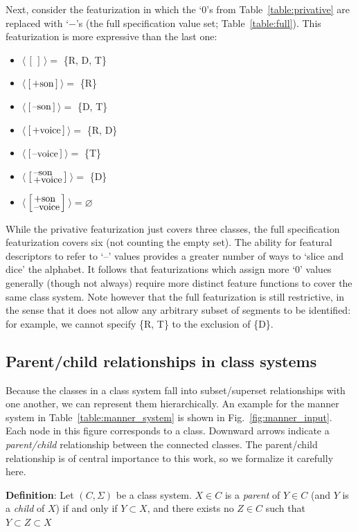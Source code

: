 \documentclass[12pt, oneside]{article}   	%
\newcommand{\featmat}[1]
{$\begin{bsmallmatrix*}[l]\text{\normalsize #1}\end{bsmallmatrix*}$}
\newcommand{\featmattwo}[2]{$\begin{bsmallmatrix*}[l]\text{\normalsize #1}\\\text{\normalsize #2}\end{bsmallmatrix*}$}
\begin{document}
Next, consider the featurization in which the `$0$'s from Table~\ref{table:privative} are replaced with `$-$'s (the full specification value set; Table~\ref{table:full}). This featurization is more expressive than the last one: 
\begin{itemize}
    \item $\langle \, [\,] \, \rangle =$ \{R, D, T\}
    \item $\langle \, $\featmat{+son}$ \, \rangle =$ \{R\}
    \item $\langle \, $\featmat{--son}$ \, \rangle =$ \{D, T\}
    \item $\langle \, $\featmat{+voice}$\, \rangle =$ \{R, D\}
    \item $\langle \, $\featmat{--voice}$  \, \rangle=$ \{T\}
    \item $\langle \, $\featmattwo{--son}{+voice}$ \, \rangle =$ \{D\}
    \item $\langle \, $\featmattwo{+son}{--voice}$ \, \rangle = \varnothing$
    \end{itemize}
While the privative featurization just covers three classes, the full specification featurization covers six (not counting the empty set). The ability for featural descriptors to refer to `--' values provides a greater number of ways to `slice and dice' the alphabet. It follows that featurizations which assign more `$0$' values generally (though not always) require more distinct feature functions to cover the same class system. Note however that the full featurization is still restrictive, in the sense that it does not allow any arbitrary subset of segments to be identified: for example, we cannot specify \{R, T\} to the exclusion of \{D\}.

\subsection{Parent/child relationships in class systems}

Because the classes in a class system fall into subset/superset relationships with one another, we can represent them hierarchically. An example for the manner system in Table~\ref{table:manner_system} is shown in Fig.~\ref{fig:manner_input}. Each node in this figure corresponds to a class. Downward arrows indicate a \textit{parent/child} relationship between the connected classes. The parent/child relationship is of central importance to this work, so we formalize it carefully here.

\vspace{\baselineskip} \noindent \textbf{Definition}: Let $(C, \Sigma)$ be a class system. $X \in C$ is a \textit{parent} of $Y \in C$ (and $Y$ is a \textit{child} of $X$) if and only if $Y \subset X$, and there exists no $Z \in C$ such that $Y \subset Z \subset X$
\end{document}

